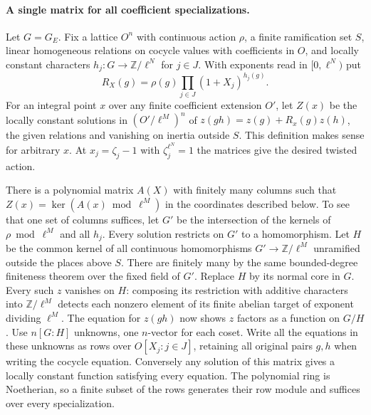 \paragraph{A single matrix for all coefficient specializations.}
Let $G=G_E$. Fix a lattice $O^n$ with continuous action $\rho$, a finite
ramification set $S$, linear homogeneous relations on cocycle values with
coefficients in $O$, and locally constant characters
$h_j:G\to\mathbb Z/\ell^N$ for $j\in J$. With exponents read in
$[0,\ell^N)$ put
\[
 R_X(g)=\rho(g)\prod_{j\in J}(1+X_j)^{h_j(g)}.
\]
For an integral point $x$ over any finite coefficient extension $O'$,
let $Z(x)$ be the locally constant solutions in $(O'/\ell^M)^n$ of
$z(gh)=z(g)+R_x(g)z(h)$, the given relations and vanishing on inertia
outside $S$. This definition makes sense for arbitrary $x$.
At $x_j=\zeta_j-1$ with $\zeta_j^{\ell^N}=1$ the matrices give the
desired twisted action.

There is a polynomial matrix $A(X)$ with finitely many columns such that
$Z(x)=\ker(A(x)\bmod\ell^M)$ in the coordinates described below.
To see that one set of columns suffices, let $G'$ be the intersection of
the kernels of $\rho\bmod\ell^M$ and all $h_j$. Every solution restricts
on $G'$ to a homomorphism. Let $H$ be the common kernel of all continuous
homomorphisms $G'\to\mathbb Z/\ell^M$ unramified outside the places above
$S$. There are finitely many by the same bounded-degree finiteness theorem
over the fixed field of $G'$. Replace $H$ by its normal core in $G$.
Every such $z$ vanishes on $H$: composing its restriction with additive
characters into $\mathbb Z/\ell^M$ detects each nonzero element of its
finite abelian target of exponent dividing $\ell^M$. The equation for
$z(gh)$ now shows $z$ factors as a function on $G/H$. Use $n[G:H]$
unknowns, one $n$-vector for each coset. Write all the equations in these
unknowns as rows over $O[X_j:j\in J]$, retaining all original pairs
$g,h$ when writing the cocycle equation. Conversely any solution of this
matrix gives a locally constant function satisfying every equation.
The polynomial ring is Noetherian, so a finite subset of the rows
generates their row module and suffices over every specialization.

